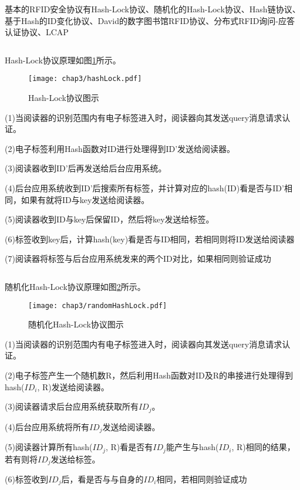 基本的RFID安全协议有Hash-Lock协议\supercite{裴友林2008rfid}、随机化的Hash-Lock协议\supercite{陆艺凡2013rfid}、Hash链协议\supercite{陆艺凡2013rfid}、基于Hash的ID变化协议\supercite{袁署光2008基于}、David的数字图书馆RFID协议\supercite{裴友林2008rfid}、分布式RFID询问-应答认证协议\supercite{裴友林2008rfid}、LCAP\supercite{陆艺凡2013rfid}

\[\]

Hash-Lock协议原理如图\ref{fig:Hash-Lock协议图示}所示。

\begin{figure}[H]
	\centering
	\texttt{[image: chap3/hashLock.pdf]}
	\caption{Hash-Lock协议图示}\label{fig:Hash-Lock协议图示}
\end{figure}

(1)当阅读器的识别范围内有电子标签进入时，阅读器向其发送query消息请求认证。

(2)电子标签利用Hash函数对ID进行处理得到ID'发送给阅读器。

(3)阅读器收到ID'后再发送给后台应用系统。

(4)后台应用系统收到ID'后搜索所有标签，并计算对应的hash(ID)看是否与ID'相同，如果有就将ID与key发送给阅读器。

(5)阅读器收到ID与key后保留ID，然后将key发送给标签。

(6)标签收到key后，计算hash(key)看是否与ID相同，若相同则将ID发送给阅读器

(7)阅读器将标签与后台应用系统发来的两个ID对比，如果相同则验证成功

\[\]

随机化Hash-Lock协议原理如图\ref{fig:随机化Hash-Lock协议图示}所示。

\begin{figure}[H]
	\centering
	\texttt{[image: chap3/randomHashLock.pdf]}
	\caption{随机化Hash-Lock协议图示}\label{fig:随机化Hash-Lock协议图示}
\end{figure}

(1)当阅读器的识别范围内有电子标签进入时，阅读器向其发送query消息请求认证。

(2)电子标签产生一个随机数R，然后利用Hash函数对ID及R的串接进行处理得到hash($ID_{i}$, R)发送给阅读器。

(3)阅读器请求后台应用系统获取所有$ID_{j}$。

(4)后台应用系统将所有$ID_{j}$发送给阅读器。

(5)阅读器计算所有hash($ID_{j}$, R)看是否有$ID_{j}$能产生与hash($ID_{i}$, R)相同的结果，若有则将$ID_{j}$发送给标签。

(6)标签收到$ID_{j}$后，看是否与与自身的$ID_{i}$相同，若相同则验证成功

